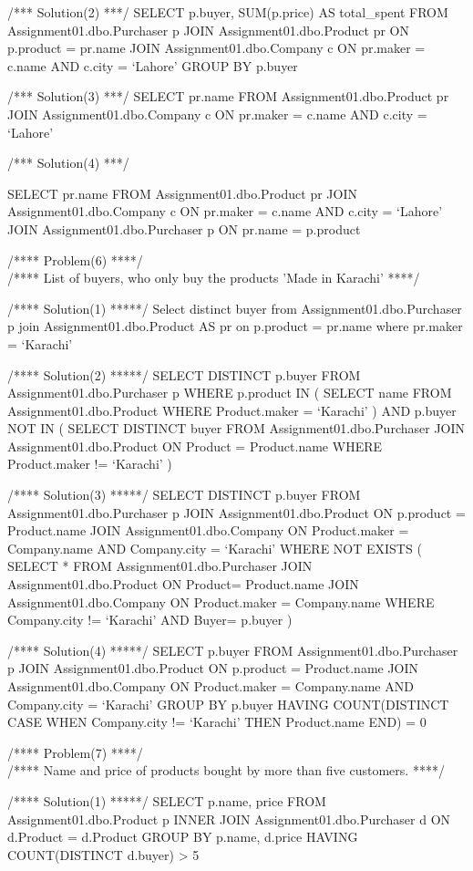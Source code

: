 /*** Solution(2) ***/ SELECT p.buyer, SUM(p.price) AS total\_spent FROM
Assignment01.dbo.Purchaser p JOIN Assignment01.dbo.Product pr ON
p.product = pr.name JOIN Assignment01.dbo.Company c ON pr.maker = c.name
AND c.city = `Lahore' GROUP BY p.buyer

/*** Solution(3) ***/ SELECT pr.name FROM Assignment01.dbo.Product pr
JOIN Assignment01.dbo.Company c ON pr.maker = c.name AND c.city =
`Lahore'

/*** Solution(4) ***/

SELECT pr.name FROM Assignment01.dbo.Product pr JOIN
Assignment01.dbo.Company c ON pr.maker = c.name AND c.city = `Lahore'
JOIN Assignment01.dbo.Purchaser p ON pr.name = p.product

/**** Problem(6) ****/\\
/**** List of buyers, who only buy the products 'Made in Karachi' ****/

/**** Solution(1) *****/ Select distinct buyer from
Assignment01.dbo.Purchaser p join Assignment01.dbo.Product AS pr on
p.product = pr.name where pr.maker = `Karachi'

/**** Solution(2) *****/ SELECT DISTINCT p.buyer FROM
Assignment01.dbo.Purchaser p WHERE p.product IN ( SELECT name FROM
Assignment01.dbo.Product WHERE Product.maker = `Karachi' ) AND p.buyer
NOT IN ( SELECT DISTINCT buyer FROM Assignment01.dbo.Purchaser JOIN
Assignment01.dbo.Product ON Product = Product.name WHERE Product.maker
!= `Karachi' )

/**** Solution(3) *****/ SELECT DISTINCT p.buyer FROM
Assignment01.dbo.Purchaser p JOIN Assignment01.dbo.Product ON p.product
= Product.name JOIN Assignment01.dbo.Company ON Product.maker =
Company.name AND Company.city = `Karachi' WHERE NOT EXISTS ( SELECT *
FROM Assignment01.dbo.Purchaser JOIN Assignment01.dbo.Product ON
Product= Product.name JOIN Assignment01.dbo.Company ON Product.maker =
Company.name WHERE Company.city != `Karachi' AND Buyer= p.buyer )

/**** Solution(4) *****/ SELECT p.buyer FROM Assignment01.dbo.Purchaser
p JOIN Assignment01.dbo.Product ON p.product = Product.name JOIN
Assignment01.dbo.Company ON Product.maker = Company.name AND
Company.city = `Karachi' GROUP BY p.buyer HAVING COUNT(DISTINCT CASE
WHEN Company.city != `Karachi' THEN Product.name END) = 0

/**** Problem(7) ****/\\
/**** Name and price of products bought by more than five customers.
****/

/**** Solution(1) *****/ SELECT p.name, price FROM
Assignment01.dbo.Product p INNER JOIN Assignment01.dbo.Purchaser d ON
d.Product = d.Product GROUP BY p.name, d.price HAVING COUNT(DISTINCT
d.buyer) \textgreater{} 5

